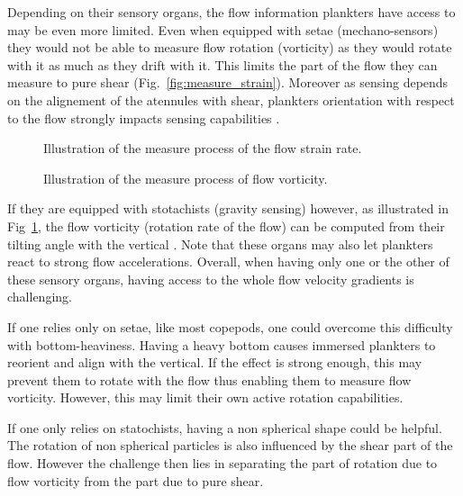 Depending on their sensory organs, the flow information plankters have access to may be even more limited.
Even when equipped with setae (mechano-sensors) they would not be able to measure flow rotation (vorticity) as they would rotate with it as much as they drift with it.
This limits the part of the flow they can measure to pure shear (Fig.~\ref{fig:measure_strain}).
Moreover as sensing depends on the alignement of the atennules with shear, plankters orientation with respect to the flow strongly impacts sensing capabilities \citep{fields2010orientation}.
\begin{figure}
	\centering
	\begin{minipage}{0.5\textwidth}
	  	\centering
		\def\svgwidth{0.6\textwidth}
		
		\captionsetup{width=0.9\textwidth}
	  	\caption{Illustration of the measure process of the flow strain rate.}
	  	\label{fig:measure_strain}
	\end{minipage}%
	\begin{minipage}{0.5\textwidth}
		\centering
		\def\svgwidth{0.6\textwidth}
		
		\captionsetup{width=0.9\textwidth}
	  	\caption{Illustration of the measure process of flow vorticity.}
	  	\label{fig:measure_vorticity}
	\end{minipage}
\end{figure}
If they are equipped with stotachists (gravity sensing) however, as illustrated in Fig~\ref{fig:measure_vorticity}, the flow vorticity (rotation rate of the flow) can be computed from their tilting angle with the vertical \citep{fuchs2015directional}.
Note that these organs may also let plankters react to strong flow accelerations.
Overall, when having only one or the other of these sensory organs, having access to the whole flow velocity gradients is challenging.

If one relies only on setae, like most copepods, one could overcome this difficulty with bottom-heaviness.
Having a heavy bottom causes immersed plankters to reorient and align with the vertical.
If the effect is strong enough, this may prevent them to rotate with the flow thus enabling them to measure flow vorticity.
However, this may limit their own active rotation capabilities.

If one only relies on statochists, having a non spherical shape could be helpful.
The rotation of non spherical particles is also influenced by the shear part of the flow.
However the challenge then lies in separating the part of rotation due to flow vorticity from the part due to pure shear.

